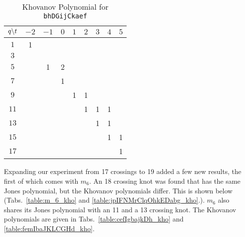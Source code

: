 \documentclass{article}
\theoremstyle{plain}
\begin{document}
        \begin{table}[H]
            \centering
            \begin{tabular}{| c | c | c | c | c | c | c | c | c |}
                \hline
                $q\symbol{92}t$&$-2$&$-1$&$0$&$1$&$2$&$3$&$4$&$5$\\
                \hline
                $1$&1&&&&&&&\\
                \hline
                $3$&&&&&&&&\\
                \hline
                $5$&&1&2&&&&&\\
                \hline
                $7$&&&1&&&&&\\
                \hline
                $9$&&&&1&1&&&\\
                \hline
                $11$&&&&&1&1&1&\\
                \hline
                $13$&&&&&&1&1&\\
                \hline
                $15$&&&&&&&1&1\\
                \hline
                $17$&&&&&&&&1\\
                \hline
            \end{tabular}
            \caption{Khovanov Polynomial for \texttt{bhDGijCkaef}}
            \label{table:bhDGijCkaef_kho}
        \end{table}
        Expanding our experiment from 17 crossings to 19 added a few new
        results, the first of which comes with
        $m_{6}$. An 18 crossing knot was found
        that has the same Jones polynomial, but the Khovanov polynomials
        differ. This is shown below
        (Tabs.~\ref{table:m_6_kho} and \ref{table:jpIFNMrClqOhkEDabg_kho}.).
        $m_{6}$ also shares its Jones polynomial with an 11 and a 13 crossing
        knot. The Khovanov polynomials are given in
        Tabs.~\ref{table:cefIgbajkDh_kho} and
        \ref{table:femIbaJKLCGHd_kho}.
\end{document}
